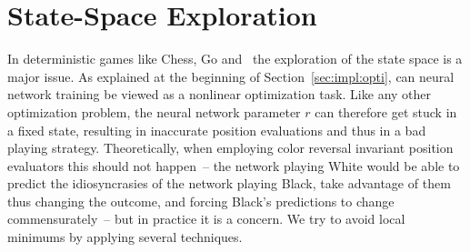 \section{State-Space Exploration} \label{sec:impl:exploration}
In deterministic games like Chess, Go and \Abalone\ the exploration of the state space is a major issue. As explained at the beginning of Section~\ref{sec:impl:opti}, can neural network training be viewed as a nonlinear optimization task. Like any other optimization problem, the neural network parameter $r$ can therefore get stuck in a fixed state, resulting in inaccurate position evaluations and thus in a bad playing strategy. Theoretically, when employing color reversal invariant position evaluators this should not happen~-- the network playing White would be able to predict the idiosyncrasies of the network playing Black, take advantage of them thus changing the outcome, and forcing Black's predictions to change commensurately~-- but in practice it is a concern. We try to avoid local minimums by applying several techniques.
